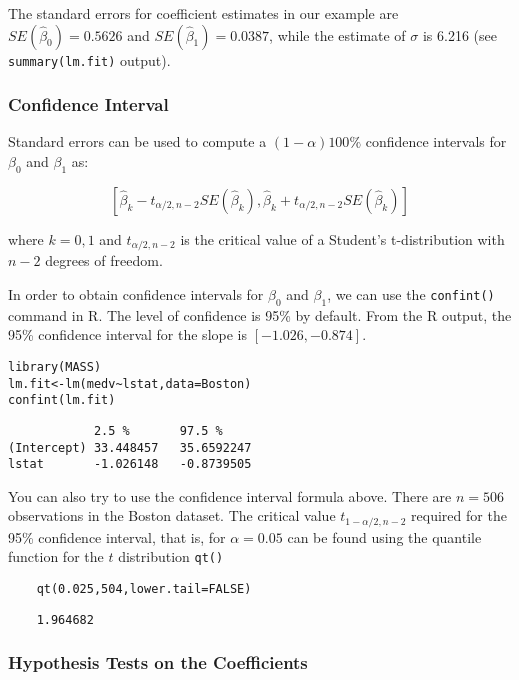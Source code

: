 \documentclass[11pt]{article}
\begin{document}
The standard errors for coefficient estimates in our example are \(SE(\hat{\beta}_0) = 0.5626\) and \(SE(\hat{\beta}_1) = 0.0387\), while the estimate of \(\sigma\) is 6.216 (see \texttt{summary(lm.fit)} output).

\subsubsection{Confidence Interval}

Standard errors can be used to compute a \((1 - \alpha)100\%\) confidence intervals for \(\beta_0\) and \(\beta_1\) as:

\[[\hat{\beta}_k - t_{\alpha/2,n-2}SE(\hat{\beta}_k), \hat{\beta}_k + t_{\alpha/2,n-2}SE(\hat{\beta}_k)]\]

where \(k = 0, 1\) and \(t_{\alpha/2,n-2}\) is the critical value of a Student's t-distribution with \(n - 2\) degrees of freedom.

In order to obtain confidence intervals for \(\beta_0\) and \(\beta_1\), we can use the \texttt{confint()} command in R. The level of confidence is 95\% by default. From the R output, the 95\% confidence interval for the slope is \([-1.026, -0.874]\).

\begin{verbatim}
library(MASS)
lm.fit<-lm(medv~lstat,data=Boston)
confint(lm.fit)
\end{verbatim}

\begin{verbatim}
            2.5 %       97.5 %
(Intercept) 33.448457   35.6592247
lstat       -1.026148   -0.8739505
\end{verbatim}

You can also try to use the conﬁdence interval formula above. There are $n=506$ observations in the Boston dataset. The critical value $t_{1 - \alpha / 2,n-2}$ required for the 95\% confidence interval, that is, for $\alpha=0.05$ can be found using the quantile function for the $t$ distribution \texttt{qt()}

\begin{verbatim}
    qt(0.025,504,lower.tail=FALSE)
\end{verbatim}

\begin{verbatim}
    1.964682
\end{verbatim}

\subsubsection{Hypothesis Tests on the Coefficients}
\end{document}
